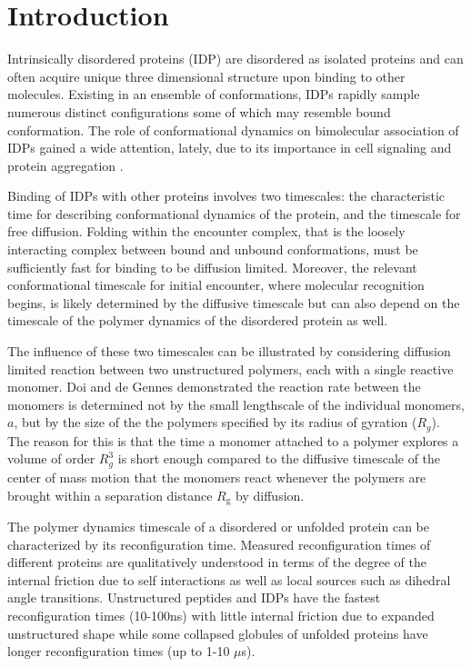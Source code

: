 \documentclass[../talant.diss.submit.tex]{subfiles}
\begin{document}
\label{chap:chapter4}
%
%
\section{\textbf{Introduction}}\label{sect:four_one}
%
Intrinsically disordered proteins (IDP) are disordered as isolated proteins and can often
acquire unique three dimensional structure upon binding to other molecules.
\cite{dyson:02,wright:09,turjanski:08,wright:99,sugase:07} 
Existing in an ensemble of conformations, IDPs rapidly sample numerous distinct
configurations some of which may resemble bound conformation. The role of conformational dynamics
on bimolecular association of IDPs gained a wide attention, lately, due to its importance
in cell signaling\cite{csermely:10a,zhou:12a} and protein aggregation \cite{ahmad:12}.

Binding of IDPs with other proteins involves two timescales:
the characteristic time for describing conformational dynamics of the protein, and the
timescale for free diffusion. Folding within the encounter complex, that is
the loosely interacting complex 
between bound and unbound conformations, must be sufficiently fast
for binding to be diffusion limited. Moreover, the relevant conformational timescale for
initial encounter, where molecular recognition begins, is likely determined by
the diffusive timescale but can also depend on the timescale of the polymer dynamics of the
disordered protein as well.

The influence of these two timescales can be illustrated by
considering diffusion limited reaction between two unstructured polymers, each
with a single reactive monomer. Doi and de Gennes demonstrated the reaction rate
between the monomers 
is determined not by the small lengthscale of the
individual monomers, $a$, but by the size of the 
the polymers specified by its radius of gyration ($R_g$).
The reason for this is that the time a monomer attached to a polymer explores
a volume of order $R_g^3$ is short enough compared to the diffusive timescale
of the center of mass motion that the monomers react whenever the polymers are brought
within a separation distance $R_\mathrm{g}$ by diffusion.\cite{doi:75,degennes:82,oshaughnessy:94}

The polymer dynamics timescale of a disordered or unfolded protein can be characterized by
its reconfiguration time. Measured reconfiguration times of different proteins are
qualitatively understood in terms of the degree of the internal friction
due to self interactions as well as local sources such as  dihedral angle transitions.
\cite{lapidus:13,buscaglia:03k}
Unstructured peptides and IDPs have the fastest reconfiguration times (10-100ns)
with little internal friction due to expanded unstructured shape
while some collapsed globules of unfolded proteins have longer reconfiguration times
(up to 1-10 $\mu$s).\cite{chen:10g,schuler:02p}
\end{document}

